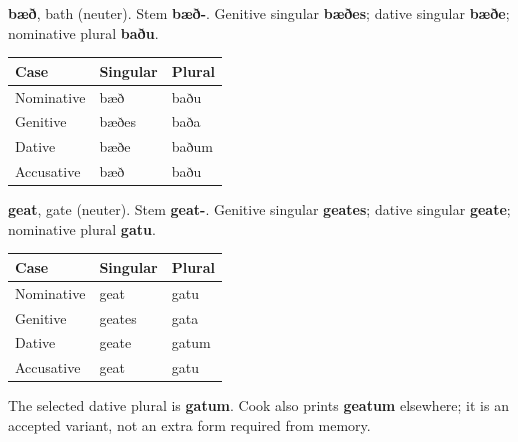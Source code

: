\textbf{bæð}, bath (neuter). Stem \textbf{bæð-}. Genitive singular \textbf{bæðes}; dative singular \textbf{bæðe}; nominative plural \textbf{baðu}.

\par\begingroup
\fontsize{10.5}{13.2}\selectfont
\setlength{\LTleft}{0pt}\setlength{\LTright}{\fill}
\noindent
\begin{tabular}{@{}>{\raggedright\arraybackslash}p{39.46mm}>{\raggedright\arraybackslash}p{39.46mm}>{\raggedright\arraybackslash}p{39.46mm}@{}}
\toprule
\textbf{Case} & \textbf{Singular} & \textbf{Plural} \\
\midrule
Nominative & bæð & baðu \\
Genitive & bæðes & baða \\
Dative & bæðe & baðum \\
Accusative & bæð & baðu \\
\bottomrule
\end{tabular}
\par\endgroup

\textbf{geat}, gate (neuter). Stem \textbf{geat-}. Genitive singular \textbf{geates}; dative singular \textbf{geate}; nominative plural \textbf{gatu}.

\par\begingroup
\fontsize{10.5}{13.2}\selectfont
\setlength{\LTleft}{0pt}\setlength{\LTright}{\fill}
\noindent
\begin{tabular}{@{}>{\raggedright\arraybackslash}p{39.46mm}>{\raggedright\arraybackslash}p{39.46mm}>{\raggedright\arraybackslash}p{39.46mm}@{}}
\toprule
\textbf{Case} & \textbf{Singular} & \textbf{Plural} \\
\midrule
Nominative & geat & gatu \\
Genitive & geates & gata \\
Dative & geate & gatum \\
Accusative & geat & gatu \\
\bottomrule
\end{tabular}
\par\endgroup

The selected dative plural is \textbf{gatum}. Cook also prints \textbf{geatum} elsewhere; it is an accepted variant, not an extra form required from memory.

